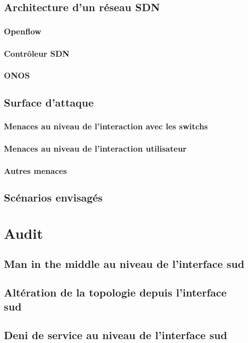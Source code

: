 \documentclass[a4paper]{article}
\begin{document}
	\subsection{Architecture d'un réseau SDN}
		\subsubsection{Openflow}
		\subsubsection{Contrôleur SDN}
		\subsubsection{ONOS}
	\subsection{Surface d'attaque}
		\subsubsection{Menaces au niveau de l'interaction avec les switchs}
		\subsubsection{Menaces au niveau de l'interaction utilisateur}
		\subsubsection{Autres menaces}
	\subsection{Scénarios envisagés}
\section{Audit}
	\subsection{Man in the middle au niveau de l'interface sud}
	\subsection{Altération de la topologie depuis l'interface sud}
	\subsection{Deni de service au niveau de l'interface sud}
\end{document}
